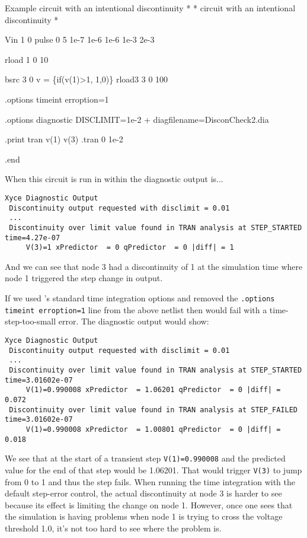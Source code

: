 \begin{NetlistFigure}{Example circuit with an intentional discontinuity}
*
* circuit with an intentional discontinuity 
*

Vin 1 0 pulse 0 5 1e-7 1e-6 1e-6 1e-3 2e-3

rload 1 0 10


bsrc 3 0 v = \{if(v(1)>1, 1,0)\}
rload3 3 0 100


.options timeint erroption=1

.options diagnostic DISCLIMIT=1e-2 
+ diagfilename=DisconCheck2.dia

.print tran v(1) v(3)
.tran 0 1e-2

.end

\end{NetlistFigure}

When this circuit is run in \Xyce{} within the diagnostic output is...
\begin{verbatim}
Xyce Diagnostic Output
 Discontinuity output requested with disclimit = 0.01
 ...
 Discontinuity over limit value found in TRAN analysis at STEP_STARTED time=4.27e-07
     V(3)=1 xPredictor  = 0 qPredictor  = 0 |diff| = 1
\end{verbatim}

And we can see that node 3 had a discontinuity of 1 at the simulation time where
node 1 triggered the step change in output.

If we used \Xyce{}'s standard time integration options and removed the \texttt{.options timeint erroption=1}
line from the above netlist then \Xyce{} would fail with a time-step-too-small error.  The
diagnostic output would show:



\begin{verbatim}
Xyce Diagnostic Output
 Discontinuity output requested with disclimit = 0.01
 ...
 Discontinuity over limit value found in TRAN analysis at STEP_STARTED time=3.01602e-07
     V(1)=0.990008 xPredictor  = 1.06201 qPredictor  = 0 |diff| = 0.072
 Discontinuity over limit value found in TRAN analysis at STEP_FAILED time=3.01602e-07
     V(1)=0.990008 xPredictor  = 1.00801 qPredictor  = 0 |diff| = 0.018
\end{verbatim}
We see that at the start of a transient step \texttt{V(1)=0.990008} and the predicted 
value for the end of that step would be 1.06201.  That would trigger \texttt{V(3)} to jump
from 0 to 1 and thus the step fails.  When running the time integration with the default 
step-error control, the actual discontinuity at node 3 is harder to see because its effect
is limiting the change on node 1.  However, once one sees that the simulation is having 
problems when node 1 is trying to cross the voltage threshold 1.0, it's not too hard to see
where the problem is. 

